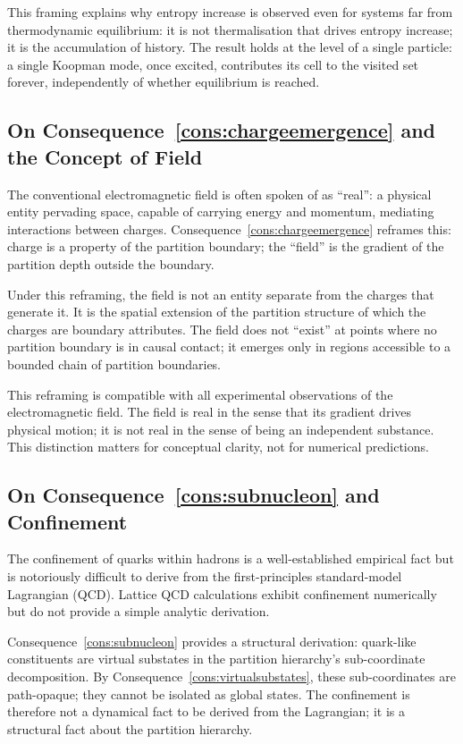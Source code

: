This framing explains why entropy increase is observed even for systems far
from thermodynamic equilibrium: it is not thermalisation that drives entropy
increase; it is the accumulation of history.  The result holds at the level
of a single particle: a single Koopman mode, once excited, contributes its
cell to the visited set forever, independently of whether equilibrium is
reached.

\subsection*{On Consequence~\ref{cons:chargeemergence} and the Concept of Field}

The conventional electromagnetic field is often spoken of as
``real'': a physical entity pervading space, capable of carrying energy and
momentum, mediating interactions between charges.
Consequence~\ref{cons:chargeemergence} reframes this: charge is a property
of the partition boundary; the ``field'' is the gradient of the partition
depth outside the boundary.

Under this reframing, the field is not an entity separate from the charges
that generate it.  It is the spatial extension of the partition structure
of which the charges are boundary attributes.  The field does not
``exist'' at points where no partition boundary is in causal contact; it
emerges only in regions accessible to a bounded chain of partition
boundaries.

This reframing is compatible with all experimental observations of the
electromagnetic field.  The field is real in the sense that its gradient
drives physical motion; it is not real in the sense of being an independent
substance.  This distinction matters for conceptual clarity, not for
numerical predictions.

\subsection*{On Consequence~\ref{cons:subnucleon} and Confinement}

The confinement of quarks within hadrons is a well-established empirical
fact but is notoriously difficult to derive from the first-principles
standard-model Lagrangian (QCD).  Lattice QCD calculations exhibit
confinement numerically but do not provide a simple analytic derivation.

Consequence~\ref{cons:subnucleon} provides a structural derivation:
quark-like constituents are virtual substates in the partition hierarchy's
sub-coordinate decomposition.  By Consequence~\ref{cons:virtualsubstates},
these sub-coordinates are path-opaque; they cannot be isolated as global
states.  The confinement is therefore not a dynamical fact to be derived
from the Lagrangian; it is a structural fact about the partition hierarchy.

